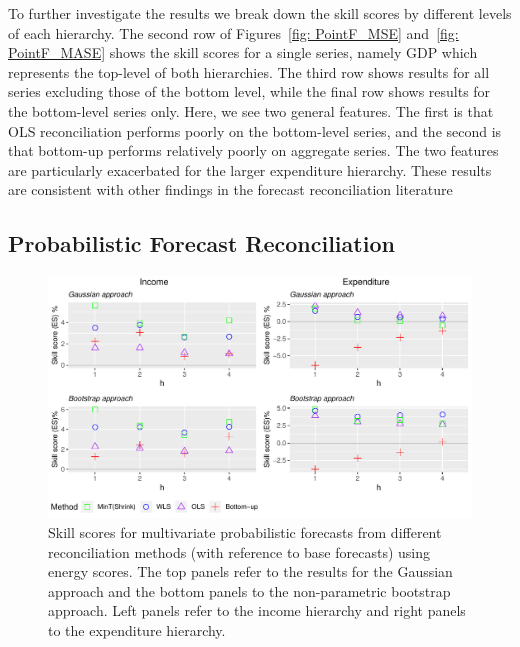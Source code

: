 \documentclass[graybox]{svmult}
\begin{document}
To further investigate the results we break down the skill scores by different levels of each hierarchy. The second row of Figures~\ref{fig: PointF_MSE} and~\ref{fig: PointF_MASE} shows the skill scores for a single series, namely GDP which represents the top-level of both hierarchies. The third row shows results for all series excluding those of the bottom level, while the final row shows results for the bottom-level series only. Here, we see two general features. The first is that OLS reconciliation performs poorly on the bottom-level series, and the second is that bottom-up performs relatively poorly on aggregate series. The two features are particularly exacerbated for the larger expenditure hierarchy. These results are consistent with other findings in the forecast reconciliation literature \citep[see for instance][]{AthEtAl2017,WicEtAl2019}

\subsection{Probabilistic Forecast Reconciliation}

\begin{figure}[!b]
	\centering
	\small
	\includegraphics[width=\textwidth]{Figs/Results/ProbF_MultivS.pdf}
	\caption{Skill scores for multivariate probabilistic forecasts from different reconciliation methods (with reference to base forecasts) using energy scores. The top panels refer to the results for the Gaussian approach and the bottom panels to the non-parametric bootstrap approach. Left panels refer to the income hierarchy and right panels to the expenditure hierarchy.}
	\label{fig: Prob-forecasts-SS_ES}
\end{figure}
\end{document}
